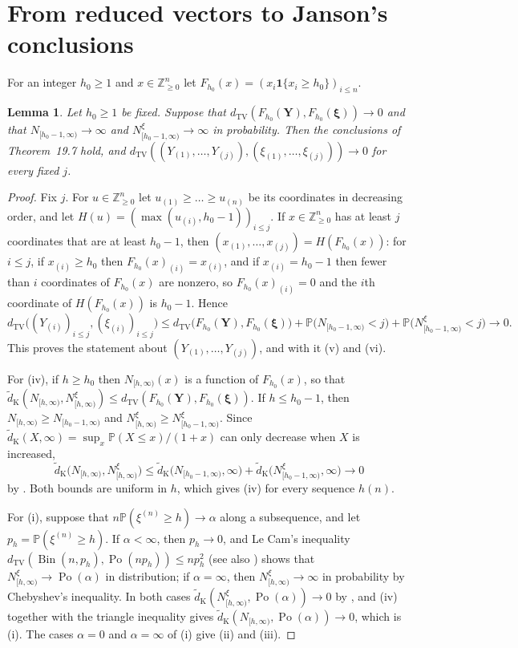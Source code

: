 \documentclass[11pt]{amsart}
\newtheorem{lemma}[theorem]{Lemma}
\theoremstyle{definition}
\theoremstyle{remark}
\numberwithin{equation}{section}
\newcommand{\Pp}{\mathbb P}
\newcommand{\Z}{\mathbb Z}
\newcommand{\dtv}{d_{\mathrm{TV}}}
\newcommand{\dKt}{\tilde d_{\mathrm K}}
\newcommand{\bY}{\mathbf Y}
\newcommand{\bxi}{\boldsymbol\xi}
\newcommand{\one}{\mathbf 1}
\DeclareMathOperator{\Po}{Po}
\DeclareMathOperator{\Bin}{Bin}
\begin{document}
\section{From reduced vectors to Janson's conclusions}\label{sec:janson}

For an integer $h_0\ge1$ and $x\in\Z_{\ge0}^n$ let $F_{h_0}(x)=(x_i\one\{x_i\ge h_0\})_{i\le n}$.

\begin{lemma}\label{lem:transfer}
Let $h_0\ge1$ be fixed. Suppose that $\dtv(F_{h_0}(\bY),F_{h_0}(\bxi))\to0$ and that $N_{[h_0-1,\infty)}\to\infty$ and $N^\xi_{[h_0-1,\infty)}\to\infty$ in probability. Then the conclusions of Theorem~19.7 hold, and $\dtv((Y_{(1)},\dots,Y_{(j)}),(\xi_{(1)},\dots,\xi_{(j)}))\to0$ for every fixed $j$.
\end{lemma}

\begin{proof}
Fix $j$. For $u\in\Z_{\ge0}^n$ let $u_{(1)}\ge\dots\ge u_{(n)}$ be its coordinates in decreasing order, and let $H(u)=(\max(u_{(i)},h_0-1))_{i\le j}$. If $x\in\Z_{\ge0}^n$ has at least $j$ coordinates that are at least $h_0-1$, then $(x_{(1)},\dots,x_{(j)})=H(F_{h_0}(x))$: for $i\le j$, if $x_{(i)}\ge h_0$ then $F_{h_0}(x)_{(i)}=x_{(i)}$, and if $x_{(i)}=h_0-1$ then fewer than $i$ coordinates of $F_{h_0}(x)$ are nonzero, so $F_{h_0}(x)_{(i)}=0$ and the $i$th coordinate of $H(F_{h_0}(x))$ is $h_0-1$. Hence
\[
\dtv\bigl((Y_{(i)})_{i\le j},(\xi_{(i)})_{i\le j}\bigr)\le\dtv\bigl(F_{h_0}(\bY),F_{h_0}(\bxi)\bigr)+\Pp\bigl(N_{[h_0-1,\infty)}<j\bigr)+\Pp\bigl(N^\xi_{[h_0-1,\infty)}<j\bigr)\to0.
\]
This proves the statement about $(Y_{(1)},\dots,Y_{(j)})$, and with it (v) and (vi).

For (iv), if $h\ge h_0$ then $N_{[h,\infty)}(x)$ is a function of $F_{h_0}(x)$, so that $\dKt(N_{[h,\infty)},N^\xi_{[h,\infty)})\le\dtv(F_{h_0}(\bY),F_{h_0}(\bxi))$. If $h\le h_0-1$, then $N_{[h,\infty)}\ge N_{[h_0-1,\infty)}$ and $N^\xi_{[h,\infty)}\ge N^\xi_{[h_0-1,\infty)}$. Since $\dKt(X,\infty)=\sup_x\Pp(X\le x)/(1+x)$ can only decrease when $X$ is increased,
\[
\dKt\bigl(N_{[h,\infty)},N^\xi_{[h,\infty)}\bigr)\le\dKt\bigl(N_{[h_0-1,\infty)},\infty\bigr)+\dKt\bigl(N^\xi_{[h_0-1,\infty)},\infty\bigr)\to0
\]
by \cite[Lemma~19.5]{J12}. Both bounds are uniform in $h$, which gives (iv) for every sequence $h(n)$.

For (i), suppose that $n\Pp(\xi^{(n)}\ge h)\to\alpha$ along a subsequence, and let $p_h=\Pp(\xi^{(n)}\ge h)$. If $\alpha<\infty$, then $p_h\to0$, and Le Cam's inequality $\dtv(\Bin(n,p_h),\Po(np_h))\le np_h^2$ \cite{LeC60} (see also \cite{BHJ92}) shows that $N^\xi_{[h,\infty)}\to\Po(\alpha)$ in distribution; if $\alpha=\infty$, then $N^\xi_{[h,\infty)}\to\infty$ in probability by Chebyshev's inequality. In both cases $\dKt(N^\xi_{[h,\infty)},\Po(\alpha))\to0$ by \cite[Lemma~19.5]{J12}, and (iv) together with the triangle inequality gives $\dKt(N_{[h,\infty)},\Po(\alpha))\to0$, which is (i). The cases $\alpha=0$ and $\alpha=\infty$ of (i) give (ii) and (iii).
\end{proof}
\end{document}
